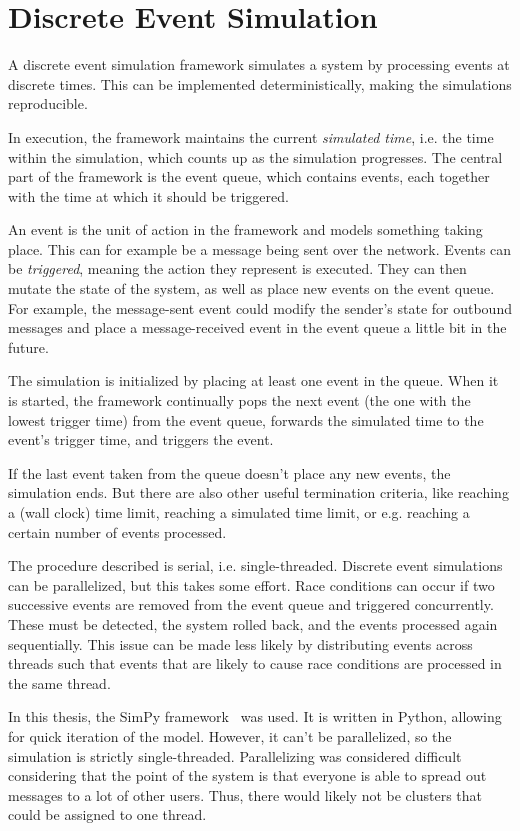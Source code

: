 \section{Discrete Event Simulation}
A discrete event simulation framework simulates a system by processing events at
discrete times. This can be implemented deterministically, making the
simulations reproducible.

In execution, the framework maintains the current
\emph{simulated time}, i.e. the time within the simulation, which counts up as
the simulation progresses. The central part of the framework is the event queue,
which contains events, each together with the time at which it should be
triggered.

An event is the unit of action in the framework and models something taking
place. This can for example be a message being sent over the network. Events can
be \emph{triggered}, meaning the action they represent is executed. They can
then mutate the state of the system, as well as place new events on the event
queue. For example, the message-sent event could modify the sender's state for
outbound messages and place a message-received event in the event queue a little
bit in the future.

The simulation is initialized by placing at least one event in the queue. When
it is started, the framework continually pops the next event (the one with the
lowest trigger time) from the event queue, forwards the simulated time to the
event's trigger time, and triggers the event.

If the last event taken from the queue doesn't place any new events, the
simulation ends. But there are also other useful termination criteria, like
reaching a (wall clock) time limit, reaching a simulated time limit, or e.g.
reaching a certain number of events processed.

The procedure described is serial, i.e. single-threaded. Discrete event
simulations can be parallelized, but this takes some effort. Race conditions can
occur if two successive events are removed from the event queue and triggered
concurrently. These must be detected, the system rolled back, and the events
processed again sequentially. This issue can be made less likely by distributing
events across threads such that events that are likely to cause race conditions
are processed in the same thread.

In this thesis, the SimPy framework~\cite{simpy} was used. It is written in
Python, allowing for quick iteration of the model. However, it can't be
parallelized, so the simulation is strictly single-threaded. Parallelizing was
considered difficult considering that the point of the system is that everyone
is able to spread out messages to a lot of other users. Thus, there would likely
not be clusters that could be assigned to one thread.

